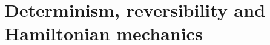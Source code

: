 \documentclass[10pt,twocolumn, nofootinbib]{revtex4-2}
\begin{document}
\section{Determinism, reversibility and Hamiltonian mechanics}

%	
\end{document}
